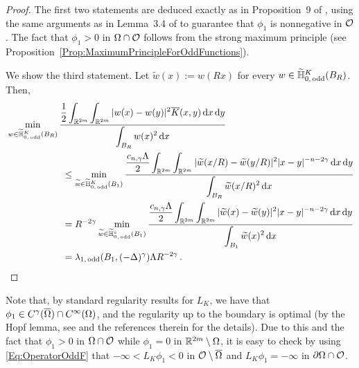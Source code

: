 \begin{proof}
	The first two statements are deduced exactly as in Proposition~9 of \cite{ServadeiValdinoci}, using the same arguments as in  Lemma~3.4 of \cite{FelipeSanz-Perela:IntegroDifferentialI} to guarantee that $\phi_1$ is nonnegative in $\mathcal{O}$. The fact that $\phi_1 > 0$ in $\Omega \cap \mathcal{O}$ follows from the strong maximum principle (see Proposition~\ref{Prop:MaximumPrincipleForOddFunctions}).
	
	We show the third statement. Let $\widetilde{w} (x):= w(Rx)$ for every $w\in \widetilde{\mathbb{H}}^K_{0, \, \mathrm{odd}}(B_R)$. Then,
	\begin{align*}
	& \min_{w \in \widetilde{\mathbb{H}}^K_{0, \, \mathrm{odd}}(B_R)} \dfrac{\dfrac{1}{2}  \displaystyle\int_{\mathbb{R}^{2m}} \int_{\mathbb{R}^{2m}} |w(x) - w(y)|^2 \overline{K}(x,y) \,\mathrm{d} x \,\mathrm{d} y}{ \displaystyle \int_{B_R} w(x)^2 \,\mathrm{d} x} \quad \quad \quad \quad \quad \quad \quad \quad \quad \quad \quad \quad\\
	&   \quad \quad \quad \quad \quad \quad \leq \min_{\widetilde{w} \in \widetilde{\mathbb{H}}^K_{0, \, \mathrm{odd}}(B_1)} \dfrac{\dfrac{c_{n, \gamma}\Lambda}{2}  \displaystyle\int_{\mathbb{R}^{2m}} \int_{\mathbb{R}^{2m}} |\widetilde{w}(x/R) - \widetilde{w}(y/R)|^2 |x - y|^{-n-2 \gamma}\,\mathrm{d} x \,\mathrm{d} y}{ \displaystyle \int_{B_R} \widetilde{w}(x/R)^2 \,\mathrm{d} x}
	\\
	& \quad \quad \quad \quad \quad \quad = R^{-2 \gamma }\min_{\widetilde{w} \in \widetilde{\mathbb{H}}^s_{0, \, \mathrm{odd}}(B_1)} \dfrac{\dfrac{c_{n, \gamma}\Lambda}{2}  \displaystyle\int_{\mathbb{R}^{2m}} \int_{\mathbb{R}^{2m}} |\widetilde{w}(x) - \widetilde{w}(y)|^2 |x - y|^{-n-2 \gamma}\,\mathrm{d} x \,\mathrm{d} y}{ \displaystyle \int_{B_1} \widetilde{w}(x)^2 \,\mathrm{d} x}
	\\
	& \quad \quad \quad \quad \quad \quad = \lambda_{1, \, \mathrm{odd}}(B_1, (-\Delta)^\gamma) \Lambda R^{-2 \gamma } \,.
	\end{align*}
\end{proof}

\begin{remark}
	\label{Remark:CsRegularityFirstEigenfunction}
	Note that, by standard regularity results for $L_K$, we have that $\phi_1 \in C^\gamma(\overline{\Omega})\cap C^\infty(\Omega)$, and the regularity up to the boundary is optimal (by the Hopf lemma, see \cite{RosOton-Survey} and the references therein for the details). Due to this and the fact that $\phi_1 >0$ in $\Omega\cap \mathcal{O}$ while $\phi_1=0$ in $\mathbb{R}^{2m}\setminus \Omega$, it is easy to check by using \eqref{Eq:OperatorOddF} that $-\infty <L_K \phi_1 < 0$ in $\mathcal{O}\setminus \overline{\Omega}$ and $L_K \phi_1 = -\infty$ in $\partial \Omega \cap \mathcal{O}$.
\end{remark}

